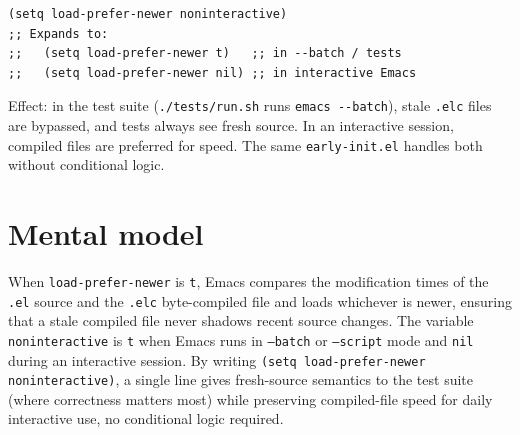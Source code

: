 \begin{verbatim}
(setq load-prefer-newer noninteractive)
;; Expands to:
;;   (setq load-prefer-newer t)   ;; in --batch / tests
;;   (setq load-prefer-newer nil) ;; in interactive Emacs
\end{verbatim}

Effect: in the test suite (\texttt{./tests/run.sh} runs \texttt{emacs -\/-batch}), stale \texttt{.elc} files are bypassed, and tests always see fresh source. In an interactive session, compiled files are preferred for speed. The same \texttt{early-init.el} handles both without conditional logic.

\section{Mental model}
When \texttt{load-prefer-newer} is \texttt{t}, Emacs compares the modification times of the \texttt{.el} source and the \texttt{.elc} byte-compiled file and loads whichever is newer, ensuring that a stale compiled file never shadows recent source changes.  The variable \texttt{noninteractive} is \texttt{t} when Emacs runs in \texttt{--batch} or \texttt{--script} mode and \texttt{nil} during an interactive session.  By writing \texttt{(setq load-prefer-newer noninteractive)}, a single line gives fresh-source semantics to the test suite (where correctness matters most) while preserving compiled-file speed for daily interactive use, no conditional logic required.
